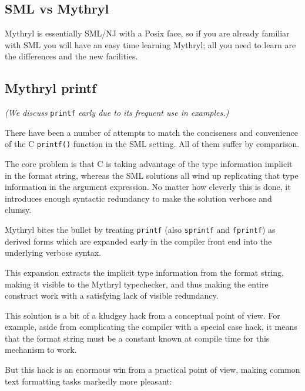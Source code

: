 
\subsection{SML vs Mythryl}

Mythryl is essentially {\sc SML/NJ} with a Posix face, so if you are already familiar with 
SML you will have an easy time learning Mythryl;  all you need to learn are the differences 
and the new facilities.

\cutend*

\subsection{Mythryl printf}

{\it (We discuss} {\tt printf} {\it early due to its frequent use in examples.)}

There have been a number of attempts to match the conciseness and 
convenience of the C {\tt printf()} function in the SML setting. 
All of them suffer by comparison.

The core problem is that C is taking advantage of the type information 
implicit in the format string, whereas the SML solutions all wind 
up replicating that type information in the argument expression.  No 
matter how cleverly this is done, it introduces enough syntactic 
redundancy to make the solution verbose and clumsy.

Mythryl bites the bullet by treating {\tt printf} (also {\tt sprintf} and 
{\tt fprintf}) as derived forms which are expanded early in the 
compiler front end into the underlying verbose syntax.

This expansion extracts the implicit type information from the format 
string, making it visible to the Mythryl typechecker, and thus making 
the entire construct work with a satisfying lack of visible redundancy.

This solution is a bit of a kludgey hack from a conceptual point of view. 
For example, aside from complicating the compiler with a special case 
hack, it means that the format string must be a constant known at 
compile time for this mechanism to work.

But this hack is an enormous win from a practical point of view, making 
common text formatting tasks markedly more pleasant:

